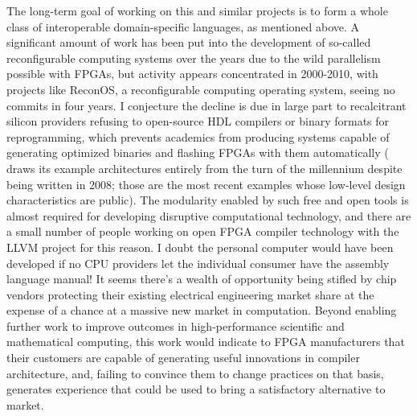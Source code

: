 \documentclass[12pt, arial, letterpaper]{article}
\begin{document}
The long-term goal of working on this and similar projects is to form a whole class of interoperable domain-specific languages, as mentioned above. A significant amount of work has been put into the development of so-called reconfigurable computing systems over the years\cite{moth} due to the wild parallelism possible with FPGAs, but activity appears concentrated in 2000-2010, with projects like ReconOS\cite{recon}, a reconfigurable computing operating system, seeing no commits in four years. I conjecture the decline is due in large part to recalcitrant silicon providers refusing to open-source HDL compilers or binary formats for reprogramming, which prevents academics from producing systems capable of generating optimized binaries and flashing FPGAs with them automatically (\cite{moth} draws its example architectures entirely from the turn of the millennium despite being written in 2008; those are the most recent examples whose low-level design characteristics are public). The modularity enabled by such free and open tools is almost required for developing disruptive computational technology, and there are a small number of people working on open FPGA compiler technology with the LLVM project for this reason. I doubt the personal computer would have been developed if no CPU providers let the individual consumer have the assembly language manual! It seems there's a wealth of opportunity being stifled by chip vendors protecting their existing electrical engineering market share at the expense of a chance at a massive new market in computation. Beyond enabling further work to improve outcomes in high-performance scientific and mathematical computing, this work would indicate to FPGA manufacturers that their customers are capable of generating useful innovations in compiler architecture, and, failing to convince them to change practices on that basis, generates experience that could be used to bring a satisfactory alternative to market.



\end{document}
